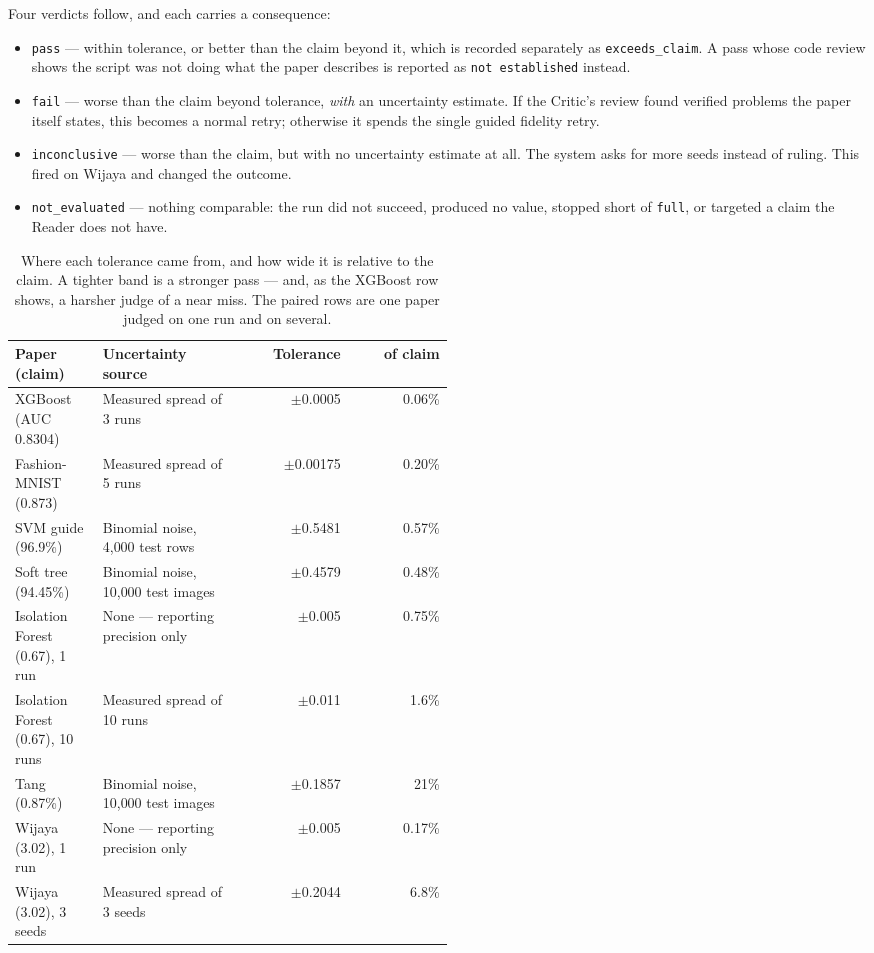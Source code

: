 \documentclass[10pt,twocolumn]{article}
\newcommand{\squeeze}{\setlength{\tabcolsep}{4pt}}
\begin{document}
Four verdicts follow, and each carries a consequence:

\begin{itemize}
  \item \texttt{pass} --- within tolerance, or better than the claim beyond it, which is recorded
    separately as \texttt{exceeds\_claim}. A pass whose code review shows the script was not
    doing what the paper describes is reported as \texttt{not established} instead.
  \item \texttt{fail} --- worse than the claim beyond tolerance, \emph{with} an uncertainty
    estimate. If the Critic's review found verified problems the paper itself states, this becomes
    a normal retry; otherwise it spends the single guided fidelity retry.
  \item \texttt{inconclusive} --- worse than the claim, but with no uncertainty estimate at all.
    The system asks for more seeds instead of ruling. This fired on Wijaya and changed the
    outcome.
  \item \texttt{not\_evaluated} --- nothing comparable: the run did not succeed, produced no value,
    stopped short of \texttt{full}, or targeted a claim the Reader does not have.
\end{itemize}

\begin{table}[tbp]
\centering
\small
\caption{Where each tolerance came from, and how wide it is relative to the claim. A tighter band
is a stronger pass --- and, as the XGBoost row shows, a harsher judge of a near miss. The paired
rows are one paper judged on one run and on several.}
\label{tab:tolerance}
\squeeze
\begin{tabular}{L{0.2\linewidth}L{0.31\linewidth}rr}
\toprule
Paper (claim) & Uncertainty source & Tolerance & of claim \\
\midrule
XGBoost (AUC 0.8304) & Measured spread of 3 runs & $\pm$0.0005 & 0.06\% \\
Fashion-MNIST (0.873) & Measured spread of 5 runs & $\pm$0.00175 & 0.20\% \\
SVM guide (96.9\%) & Binomial noise, 4{,}000 test rows & $\pm$0.5481 & 0.57\% \\
Soft tree (94.45\%) & Binomial noise, 10{,}000 test images & $\pm$0.4579 & 0.48\% \\
Isolation Forest (0.67), 1 run & None --- reporting precision only & $\pm$0.005 & 0.75\% \\
Isolation Forest (0.67), 10 runs & Measured spread of 10 runs & $\pm$0.011 & 1.6\% \\
Tang (0.87\%) & Binomial noise, 10{,}000 test images & $\pm$0.1857 & 21\% \\
Wijaya (3.02), 1 run & None --- reporting precision only & $\pm$0.005 & 0.17\% \\
Wijaya (3.02), 3 seeds & Measured spread of 3 seeds & $\pm$0.2044 & 6.8\% \\
\bottomrule
\end{tabular}
\end{table}
\end{document}
